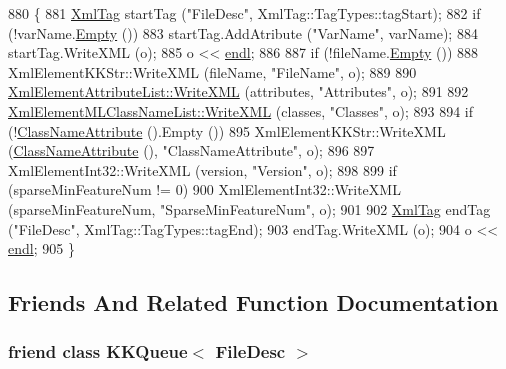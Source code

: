 \begin{DoxyCode}
880 \{
881   \hyperlink{class_k_k_b_1_1_xml_tag}{XmlTag}  startTag (\textcolor{stringliteral}{"FileDesc"}, XmlTag::TagTypes::tagStart);
882   \textcolor{keywordflow}{if}  (!varName.\hyperlink{class_k_k_b_1_1_k_k_str_ac69942f73fffd672ec2a6e1c410afdb6}{Empty} ())
883     startTag.AddAtribute (\textcolor{stringliteral}{"VarName"}, varName);
884   startTag.WriteXML (o);
885   o << \hyperlink{namespace_k_k_b_ad1f50f65af6adc8fa9e6f62d007818a8}{endl};
886 
887   \textcolor{keywordflow}{if}  (!fileName.\hyperlink{class_k_k_b_1_1_k_k_str_ac69942f73fffd672ec2a6e1c410afdb6}{Empty} ())
888     XmlElementKKStr::WriteXML (fileName, \textcolor{stringliteral}{"FileName"}, o);
889 
890   \hyperlink{class_k_k_b_1_1_xml_element_template_aa32ee34673b14ffadd1d80c2960292b1}{XmlElementAttributeList::WriteXML} (attributes, \textcolor{stringliteral}{"Attributes"}, o);
891 
892   \hyperlink{class_k_k_m_l_l_1_1_xml_element_m_l_class_name_list_a4aa7bfd29f8150ff0d4097646aa9fa77}{XmlElementMLClassNameList::WriteXML} (classes, \textcolor{stringliteral}{"Classes"}, o);
893 
894   \textcolor{keywordflow}{if}  (!\hyperlink{class_k_k_m_l_l_1_1_file_desc_ab5923982e34cb29369ab4bad36ce342a}{ClassNameAttribute} ().Empty ())
895     XmlElementKKStr::WriteXML (\hyperlink{class_k_k_m_l_l_1_1_file_desc_ab5923982e34cb29369ab4bad36ce342a}{ClassNameAttribute} (), \textcolor{stringliteral}{"ClassNameAttribute"}, o);
896 
897   XmlElementInt32::WriteXML (version, \textcolor{stringliteral}{"Version"}, o);
898 
899   \textcolor{keywordflow}{if}  (sparseMinFeatureNum  != 0)
900     XmlElementInt32::WriteXML (sparseMinFeatureNum, \textcolor{stringliteral}{"SparseMinFeatureNum"}, o);
901 
902   \hyperlink{class_k_k_b_1_1_xml_tag}{XmlTag}  endTag (\textcolor{stringliteral}{"FileDesc"}, XmlTag::TagTypes::tagEnd);
903   endTag.WriteXML (o);
904   o << \hyperlink{namespace_k_k_b_ad1f50f65af6adc8fa9e6f62d007818a8}{endl};
905 \}
\end{DoxyCode}


\subsection{Friends And Related Function Documentation}
\subsubsection[{\texorpdfstring{K\+K\+Queue$<$ File\+Desc $>$}{KKQueue< FileDesc >}}]{\setlength{\rightskip}{0pt plus 5cm}friend class {\bf K\+K\+Queue}$<$ {\bf File\+Desc} $>$\hspace{0.3cm}{\ttfamily [friend]}}\hypertarget{class_k_k_m_l_l_1_1_file_desc_a7ca7163d7420f017802ef34ae67e9515}{}\label{class_k_k_m_l_l_1_1_file_desc_a7ca7163d7420f017802ef34ae67e9515}


